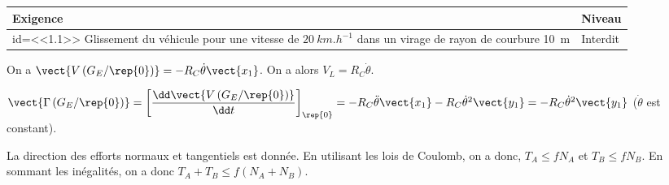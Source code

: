 \begin{center}
\begin{tabular}{|p{.7\linewidth}|p{.2\linewidth}|}
\hline 
Exigence & Niveau \\
\hline
id=<<1.1>> Glissement du véhicule pour une vitesse de $\SI{20}{km.h^{-1}}$ dans un virage de rayon de courbure \SI{10}{m} 
& Interdit \\
\hline
\end{tabular}
\end{center}

\fi


\ifprof
\begin{corrige}
On a $\vect{V\left(G_E /\rep{0}\right)}=-R_C\dot{\theta}\vect{x_1}$. On a alors $V_L=R_C\dot{\theta}$. 
\end{corrige}
\else
\fi

\ifnormal
{}
\else
\fi


\ifprof
\begin{corrige}
$\vect{\Gamma \left(G_E /\rep{0}\right)}=\left[\dfrac{\dd \vect{V\left(G_E /\rep{0}\right)}}{\dd t}\right]_{\rep{0}}= 
-R_C\ddot{\theta}\vect{x_1}-R_C\dot{\theta}^2\vect{y_1}=-R_C\dot{\theta}^2\vect{y_1}$ ($\dot{\theta}$ est constant).
\end{corrige}
\else
\fi

\ifnormal
{}
\else
\fi

\ifprof
\begin{corrige}
La direction des efforts normaux et tangentiels est donnée. En utilisant les lois de Coulomb, on a donc, $T_A\leq fN_A$ et $T_B\leq fN_B$. En sommant les inégalités, on a donc $T_A+T_B\leq f\left(N_A+N_B\right)$.
\end{corrige}
\else
\fi

